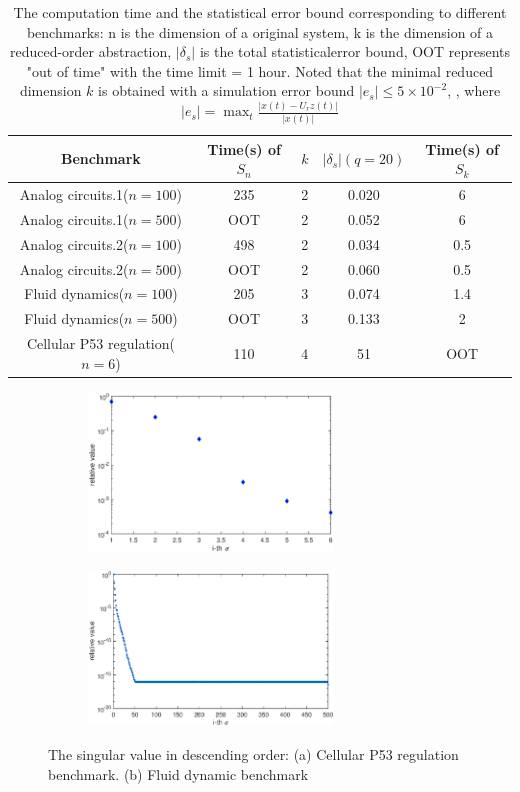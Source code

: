 \documentclass[runningheads,a4paper]{llncs}
\theoremstyle{definition}
\theoremstyle{plain}
\begin{document}
\begin{table}[htbp]
  \centering
  \caption{The computation time and the statistical error bound corresponding to different benchmarks: n is the dimension of a original system, k is the dimension of a reduced-order abstraction, $|\delta_s|$ is the total statisticalerror bound, OOT represents "out of time" with the time limit = 1 hour. Noted that the minimal reduced dimension $k$ is obtained with a simulation error bound $|e_s|\leq 5 \times 10^{-2}$, , where $|e_s|=\max_t\frac{|x(t)-U_r z(t)|}{|x(t)|}$}
  \label{tab:table1}
  \begin{tabular}{ccccc}
    \toprule
    Benchmark & Time(s) of $S_n$ & $k$ & $|\delta_s| (q=20)$ & Time(s) of $S_k$\\
    \midrule
   Analog circuits.1($n=100$) & 235 & 2 &0.020& 6\\
   Analog circuits.1($n=500$) & OOT & 2 &0.052& 6\\
   Analog circuits.2($n=100$)  & 498 & 2 & 0.034& 0.5\\
   Analog circuits.2($n=500$) & OOT & 2 &0.060& 0.5\\
   Fluid dynamics($n=100$)  & 205 & 3 &0.074&1.4\\
   Fluid dynamics($n=500$)  & OOT& 3 &0.133&2\\
   Cellular P53 regulation($n=6$)  & 110& 4 &51&OOT\\
    \bottomrule
  \end{tabular}
\end{table}

\begin{figure}[h]
\begin{subfigure}{.5\textwidth}
  \centering
  \includegraphics[width=6.5cm]{p53_singular_value_log}
  \parbox{4cm}{\subcaption{}}
\end{subfigure}%
\begin{subfigure}{.5\textwidth}
  \centering
  \includegraphics[width=6.5cm]{Fluid_singular_value_log}
  \parbox{4cm}{\subcaption{}}
\end{subfigure}%
\caption{The singular value in descending order: (a) Cellular P53 regulation benchmark. (b) Fluid dynamic benchmark}
\label{fig:singular_value}
\end{figure}
\end{document}

